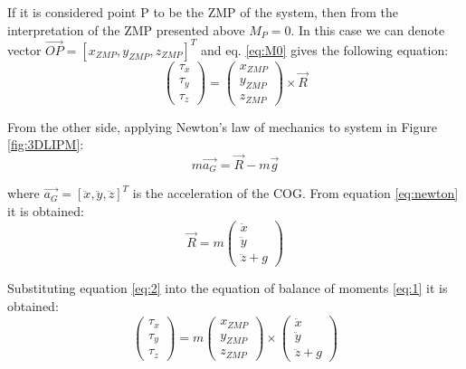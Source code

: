 If it is considered point P to be the ZMP of the system, then from the interpretation of the ZMP presented above $M_P = 0$. In this case we can denote vector $\overrightarrow{OP} = [x_{ZMP}, y_{ZMP}, z_{ZMP}]^T$ and eq. \eqref{eq:M0} gives the following equation:
\begin{equation}
\begin{pmatrix}
\tau_x \\
\tau_y \\
\tau_z 
\end{pmatrix} 
=
\begin{pmatrix}
x_{ZMP} \\
y_{ZMP} \\
z_{ZMP}
\end{pmatrix}
\times \overrightarrow{R}
\label{eq:1}
\end{equation}

From the other side, applying Newton’s law of mechanics to system in Figure \ref{fig:3DLIPM}:
\begin{equation}
m \overrightarrow{a_G} = \overrightarrow{R} - m\overrightarrow{g}
\label{eq:newton}
\end{equation}

where $\overrightarrow{a_G} = [\ddot{x}, \ddot{y}, \ddot{z}]^T$ is the acceleration of the COG. From equation \eqref{eq:newton} it is obtained:
\begin{equation}
\overrightarrow{R} = m 
\begin{pmatrix}
\ddot{x} \\
\ddot{y} \\
\ddot{z} + g
\end{pmatrix}
\label{eq:2}
\end{equation}

Substituting equation \eqref{eq:2} into the equation of balance of moments \eqref{eq:1} it is obtained:
\begin{equation}
\begin{pmatrix}
\tau_x \\
\tau_y \\
\tau_z 
\end{pmatrix} 
= m
\begin{pmatrix}
x_{ZMP} \\
y_{ZMP} \\
z_{ZMP}
\end{pmatrix}
\times
\begin{pmatrix}
\ddot{x} \\
\ddot{y} \\
\ddot{z} + g
\end{pmatrix}
\end{equation}

